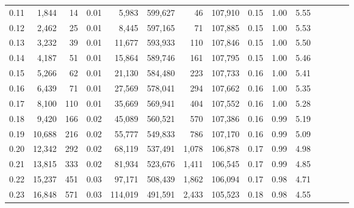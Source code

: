 \begin{tabular}{rrrcrrrrrrrrrrr}
0.11 &   1,844 &     14 &                                       0.01 &    5,983 &  599,627 &       46 &  107,910 &  0.15 &  1.00 &                         5.55 \\
0.12 &   2,462 &     25 &                                       0.01 &    8,445 &  597,165 &       71 &  107,885 &  0.15 &  1.00 &                         5.53 \\
0.13 &   3,232 &     39 &                                       0.01 &   11,677 &  593,933 &      110 &  107,846 &  0.15 &  1.00 &                         5.50 \\
0.14 &   4,187 &     51 &                                       0.01 &   15,864 &  589,746 &      161 &  107,795 &  0.15 &  1.00 &                         5.46 \\
0.15 &   5,266 &     62 &                                       0.01 &   21,130 &  584,480 &      223 &  107,733 &  0.16 &  1.00 &                         5.41 \\
0.16 &   6,439 &     71 &                                       0.01 &   27,569 &  578,041 &      294 &  107,662 &  0.16 &  1.00 &                         5.35 \\
0.17 &   8,100 &    110 &                                       0.01 &   35,669 &  569,941 &      404 &  107,552 &  0.16 &  1.00 &                         5.28 \\
0.18 &   9,420 &    166 &                                       0.02 &   45,089 &  560,521 &      570 &  107,386 &  0.16 &  0.99 &                         5.19 \\
0.19 &  10,688 &    216 &                                       0.02 &   55,777 &  549,833 &      786 &  107,170 &  0.16 &  0.99 &                         5.09 \\
0.20 &  12,342 &    292 &                                       0.02 &   68,119 &  537,491 &    1,078 &  106,878 &  0.17 &  0.99 &                         4.98 \\
0.21 &  13,815 &    333 &                                       0.02 &   81,934 &  523,676 &    1,411 &  106,545 &  0.17 &  0.99 &                         4.85 \\
0.22 &  15,237 &    451 &                                       0.03 &   97,171 &  508,439 &    1,862 &  106,094 &  0.17 &  0.98 &                         4.71 \\
0.23 &  16,848 &    571 &                                       0.03 &  114,019 &  491,591 &    2,433 &  105,523 &  0.18 &  0.98 &                         4.55 \\

\end{tabular}
